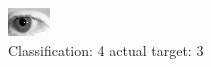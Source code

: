 \begin{figure}[h!]
\begin{center}
\includegraphics[width=0.60\columnwidth]{figures/ID194_class_4_target_3.png}
\end{center}
\caption{ Classification: 4 actual target: 3}
\label{fig:ID194_class_4_target_3}
\end{figure}

